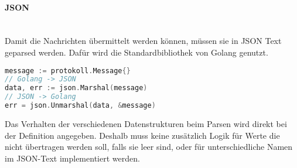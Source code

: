 \documentclass[./einleitung.tex]{subfiles}
\begin{document}
    \paragraph{JSON}\mbox{}\\
    Damit die Nachrichten übermittelt werden können, müssen sie in JSON Text geparsed werden.
    Dafür wird die Standardbibliothek von Golang genutzt.
    \begin{lstlisting}[language=Go, caption=Umwandlung von und zu JSON, label=lst:json]
message := protokoll.Message{}
// Golang -> JSON
data, err := json.Marshal(message)
// JSON -> Golang
err = json.Unmarshal(data, &message)
    \end{lstlisting}
    Das Verhalten der verschiedenen Datenstrukturen beim Parsen wird direkt bei der Definition angegeben.
    Deshalb muss keine zusätzlich Logik für Werte die nicht übertragen werden soll, falls sie leer sind, oder für unterschiedliche Namen im JSON-Text implementiert werden.
\end{document}
